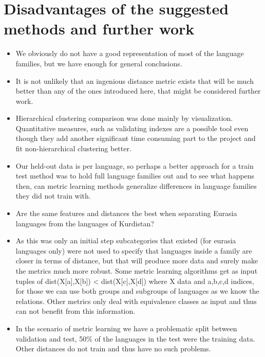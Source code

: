 \documentclass[letterpaper, 11pt]{article}
\begin{document}
\section{Disadvantages of the suggested methods and further work}
\begin{itemize}
	\item We obviously do not have a good representation of most of the language families, but we have enough for general conclusions.
	\item It is not unlikely that an ingenious distance metric exists that will be much better than any of the ones introduced here, that might be considered further work.
	\item Hierarchical clustering comparison was done mainly by visualization. Quantitative measures, such as validating indexes are a possible tool even though they add another significant time consuming part to the project and fit non-hierarchical clustering better.
	\item Our held-out data is per language, so perhaps a better approach for a train test method was to hold full language families out and to see what happens then, can metric learning methods generalize differences in language families they did not train with.
	\item Are the same features and distances the best when separating Eurasia languages from the languages of Kurdistan?
	\item As this was only an initial step subcategories that existed (for eurasia languages only) were not used to specify that languages inside a family are closer in terms of distance, but that will produce more data and  surely make the metrics much more robust. Some metric learning algorithms get as input tuples of dist(X[a],X[b]) < dist(X[c],X[d]) where X data and a,b,c,d indices, for those we can use both groups and subgroups of languages as we know the relations. Other metrics only deal with equivalence classes as input and thus can not benefit from this information.
	\item In the scenario of metric learning we have a problematic split between validation and test, 50\% of the languages in the test were the training data. Other distances do not train and thus have no such problems.
\end{itemize}

\appendix
\end{document}
